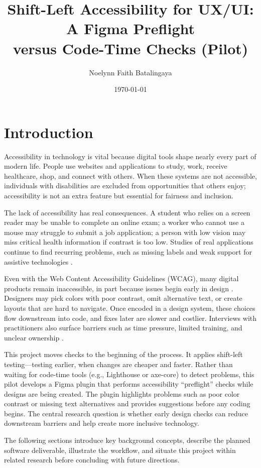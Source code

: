 \documentclass[12pt]{article}
\title{Shift-Left Accessibility for UX/UI: A Figma Preflight\\
versus Code-Time Checks (Pilot)}
\author{Noelynn Faith Batalingaya}
\date{\today}
\begin{document}
\maketitle

\section{Introduction}
Accessibility in technology is vital because digital tools shape nearly every part of modern life. People use websites and applications to study, work, receive healthcare, shop, and connect with others. When these systems are not accessible, individuals with disabilities are excluded from opportunities that others enjoy; accessibility is not an extra feature but essential for fairness and inclusion.

The lack of accessibility has real consequences. A student who relies on a screen reader may be unable to complete an online exam; a worker who cannot use a mouse may struggle to submit a job application; a person with low vision may miss critical health information if contrast is too low. Studies of real applications continue to find recurring problems, such as missing labels and weak support for assistive technologies \cite{alshayban2020androidaccess}.

Even with the Web Content Accessibility Guidelines (WCAG), many digital products remain inaccessible, in part because issues begin early in design \cite{wcag2023}. Designers may pick colors with poor contrast, omit alternative text, or create layouts that are hard to navigate. Once encoded in a design system, these choices flow downstream into code, and fixes later are slower and costlier. Interviews with practitioners also surface barriers such as time pressure, limited training, and unclear ownership \cite{shi2023uxaccesspractice}.

This project moves checks to the beginning of the process. It applies shift-left testing—testing earlier, when changes are cheaper and faster. Rather than waiting for code-time tools (e.g., Lighthouse or axe-core) to detect problems, this pilot develops a Figma plugin that performs accessibility ``preflight'' checks while designs are being created. The plugin highlights problems such as poor color contrast or missing text alternatives and provides suggestions before any coding begins. The central research question is whether early design checks can reduce downstream barriers and help create more inclusive technology.

The following sections introduce key background concepts, describe the planned software deliverable, illustrate the workflow, and situate this project within related research before concluding with future directions.
\end{document}
